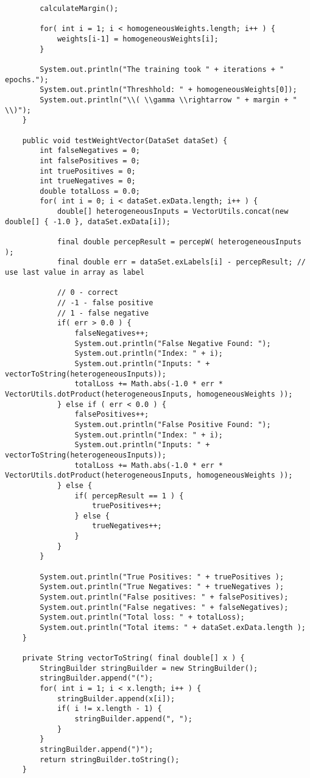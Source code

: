\begin{lstlisting}
		calculateMargin();
		
		for( int i = 1; i < homogeneousWeights.length; i++ ) {
			weights[i-1] = homogeneousWeights[i];
		}
		
		System.out.println("The training took " + iterations + " epochs.");
		System.out.println("Threshhold: " + homogeneousWeights[0]);
		System.out.println("\\( \\gamma \\rightarrow " + margin + " \\)");
	}
	
	public void testWeightVector(DataSet dataSet) {
		int falseNegatives = 0;
		int falsePositives = 0;
		int truePositives = 0;
		int trueNegatives = 0;
		double totalLoss = 0.0;
		for( int i = 0; i < dataSet.exData.length; i++ ) {
			double[] heterogeneousInputs = VectorUtils.concat(new double[] { -1.0 }, dataSet.exData[i]);
			
			final double percepResult = percepW( heterogeneousInputs );
			final double err = dataSet.exLabels[i] - percepResult; // use last value in array as label
			
			// 0 - correct
			// -1 - false positive
			// 1 - false negative
			if( err > 0.0 ) {
				falseNegatives++;
				System.out.println("False Negative Found: ");
				System.out.println("Index: " + i);
				System.out.println("Inputs: " + vectorToString(heterogeneousInputs));
				totalLoss += Math.abs(-1.0 * err * VectorUtils.dotProduct(heterogeneousInputs, homogeneousWeights ));
			} else if ( err < 0.0 ) {
				falsePositives++;
				System.out.println("False Positive Found: ");
				System.out.println("Index: " + i);
				System.out.println("Inputs: " + vectorToString(heterogeneousInputs));
				totalLoss += Math.abs(-1.0 * err * VectorUtils.dotProduct(heterogeneousInputs, homogeneousWeights ));
			} else {
				if( percepResult == 1 ) {
					truePositives++;
				} else {
					trueNegatives++;
				}
			}
		}
		
		System.out.println("True Positives: " + truePositives );
		System.out.println("True Negatives: " + trueNegatives );
		System.out.println("False positives: " + falsePositives);
		System.out.println("False negatives: " + falseNegatives);
		System.out.println("Total loss: " + totalLoss);
		System.out.println("Total items: " + dataSet.exData.length );
	}
	
	private String vectorToString( final double[] x ) {
		StringBuilder stringBuilder = new StringBuilder();
		stringBuilder.append("(");
		for( int i = 1; i < x.length; i++ ) {
			stringBuilder.append(x[i]);
			if( i != x.length - 1) {
				stringBuilder.append(", ");
			}
		}
		stringBuilder.append(")");
		return stringBuilder.toString();
	}
	

\end{lstlisting}
